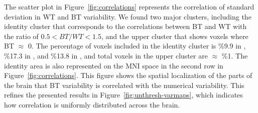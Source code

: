 \documentclass[conference]{IEEEtran}
\begin{document}
The scatter plot in Figure~\ref{fig:correlations} represents the correlation of standard deviation in WT and BT variability.
We found two major clusters, including the identity cluster that corresponds to the correlations
between BT and WT with the ratio of $0.5 < BT/WT < 1.5$,
and the upper cluster that shows voxels where BT $\approx$ 0.
The percentage of voxels included in the identity cluster is \%9.9 in \fslspm, \%17.3 in \fslafni, and \%13.8 in \afnispm,
and total voxels in the upper cluster are $\approx$ \%1.
The identity area is also represented on the MNI space in the second row in Figure~\ref{fig:correlations}.
This figure shows the spatial localization of the parts of the brain that BT variability is correlated with the numerical variability.
This refines the presented results in Figure~\ref{fig:unthresh-varmaps},
which indicates how correlation is uniformly distributed across the brain.
  
\end{document}
